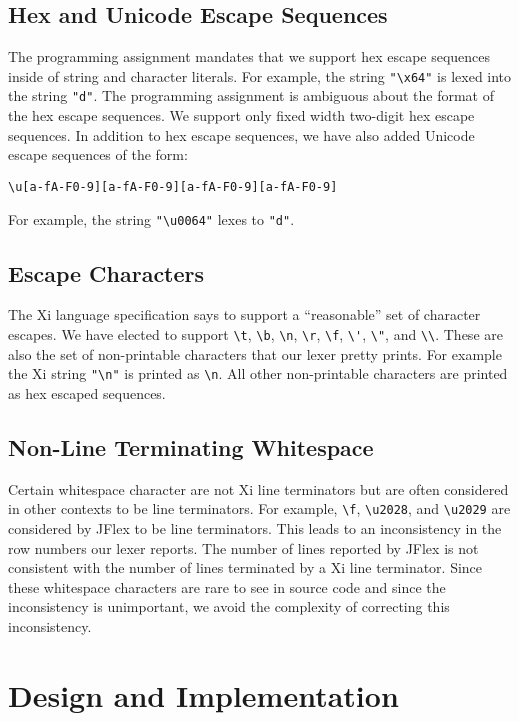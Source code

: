 \documentclass{hw}
\begin{document}
\subsection{Hex and Unicode Escape Sequences}
The programming assignment mandates that we support hex escape sequences inside
of string and character literals. For example, the string \verb$"\x64"$ is
lexed into the string \texttt{"d"}. The programming assignment is ambiguous
about the format of the hex escape sequences. We support only fixed width
two-digit hex escape sequences.
%
In addition to hex escape sequences, we have also added Unicode escape
sequences of the form:
\begin{center}
  \verb$\u[a-fA-F0-9][a-fA-F0-9][a-fA-F0-9][a-fA-F0-9]$
\end{center}
For example, the string \verb$"\u0064"$ lexes to \texttt{"d"}.

\subsection{Escape Characters}
The Xi language specification says to support a ``reasonable'' set of character
escapes. We have elected to support \verb$\t$, \verb$\b$, \verb$\n$, \verb$\r$,
\verb$\f$, \verb$\'$, \verb$\"$, and \verb$\\$. These are also the set of
non-printable characters that our lexer pretty prints. For example the Xi
string \verb$"\n"$ is printed as \verb$\n$. All other non-printable
characters are printed as hex escaped sequences.

\subsection{Non-Line Terminating Whitespace}
Certain whitespace character are not Xi line terminators but are often
considered in other contexts to be line terminators. For example, \verb$\f$,
\verb$\u2028$, and \verb$\u2029$ are considered by JFlex to be line
terminators.  This leads to an inconsistency in the row numbers our lexer
reports. The number of lines reported by JFlex is not consistent with the
number of lines terminated by a Xi line terminator. Since these whitespace
characters are rare to see in source code and since the inconsistency is
unimportant, we avoid the complexity of correcting this inconsistency.

\section{Design and Implementation}\label{sec:design}
\end{document}
